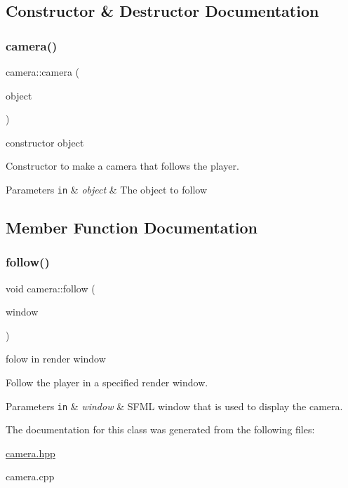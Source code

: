 \subsection{Constructor \& Destructor Documentation}
\mbox{\label{classcamera_ac3c67027b5f4f19c6f12db7d909930b5}} 
\subsubsection{\texorpdfstring{camera()}{camera()}}
{\footnotesize\ttfamily camera\+::camera (\begin{DoxyParamCaption}\item[{object\+\_\+ptr}]{object }\end{DoxyParamCaption})}



constructor object 

Constructor to make a camera that follows the player.


\begin{DoxyParams}[1]{Parameters}
\mbox{\tt in}  & {\em object} & The object to follow \\
\hline
\end{DoxyParams}


\subsection{Member Function Documentation}
\mbox{\label{classcamera_a1bb99501ba67453e0ca86f3c8aef5cb1}} 
\subsubsection{\texorpdfstring{follow()}{follow()}}
{\footnotesize\ttfamily void camera\+::follow (\begin{DoxyParamCaption}\item[{sf\+::\+Render\+Window \&}]{window }\end{DoxyParamCaption})}



folow in render window 

Follow the player in a specified render window.


\begin{DoxyParams}[1]{Parameters}
\mbox{\tt in}  & {\em window} & S\+F\+ML window that is used to display the camera. \\
\hline
\end{DoxyParams}


The documentation for this class was generated from the following files\+:\begin{DoxyCompactItemize}
\item 
\hyperlink{camera_8hpp}{camera.\+hpp}\item 
camera.\+cpp\end{DoxyCompactItemize}
